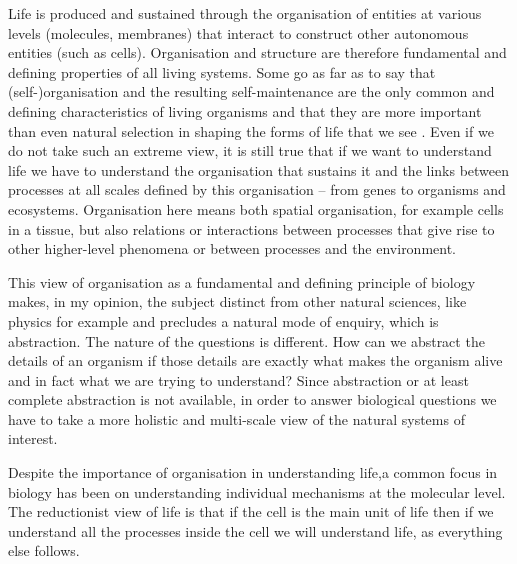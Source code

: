 Life is produced and sustained through the organisation of entities at various
levels (\eg molecules, membranes) that interact to construct other autonomous
entities (such as cells). Organisation and structure are therefore fundamental
and defining properties of all living systems. Some go as far as to say that
(self-)organisation and the resulting self-maintenance are the only common and
defining characteristics of living organisms and that they are more important
than even natural selection in shaping the forms of life that we see
\citep[sometimes referred to as structuralism, for
example;][]{thompson1942growth, kauffman1992origins}. Even if we do not take
such an extreme view, it is still true that if we want to understand life we
have to understand the organisation that sustains it and the links between
processes at all scales defined by this organisation -- from genes to organisms
and ecosystems. Organisation here means both spatial organisation, for example
cells in a tissue, but also relations or interactions between processes that
give rise to other higher-level phenomena or between processes and the
environment.

This view of organisation as a fundamental and defining principle of biology
makes, in my opinion, the subject distinct from other natural sciences, like
physics for example and precludes a natural mode of enquiry, which is
abstraction. The nature of the questions is different. How can we abstract the
details of an organism if those details are exactly what makes the organism
alive and in fact what we are trying to understand? Since abstraction or at
least complete abstraction is not available, in order to answer biological
questions we have to take a more holistic and multi-scale view of the natural
systems of interest.

Despite the importance of organisation in understanding life,a common focus in
biology has been on understanding individual mechanisms at the molecular
level. The reductionist view of life is that if the cell is the main unit of
life then if we understand all the processes inside the cell we will understand
life, as everything else follows.

